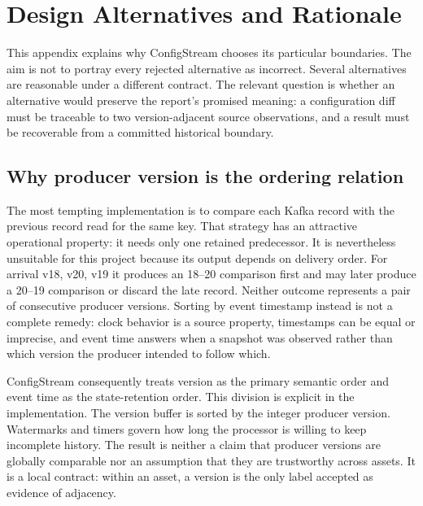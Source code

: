 
\section{Design Alternatives and Rationale}
\label{app:design-rationale}

This appendix explains why ConfigStream chooses its particular boundaries. The aim is not to portray every rejected alternative as incorrect. Several alternatives are reasonable under a different contract. The relevant question is whether an alternative would preserve the report's promised meaning: a configuration diff must be traceable to two version-adjacent source observations, and a result must be recoverable from a committed historical boundary.

\subsection{Why producer version is the ordering relation}

The most tempting implementation is to compare each Kafka record with the previous record read for the same key. That strategy has an attractive operational property: it needs only one retained predecessor. It is nevertheless unsuitable for this project because its output depends on delivery order. For arrival v18, v20, v19 it produces an 18--20 comparison first and may later produce a 20--19 comparison or discard the late record. Neither outcome represents a pair of consecutive producer versions. Sorting by event timestamp instead is not a complete remedy: clock behavior is a source property, timestamps can be equal or imprecise, and event time answers when a snapshot was observed rather than which version the producer intended to follow which.

ConfigStream consequently treats version as the primary semantic order and event time as the state-retention order. This division is explicit in the implementation. The version buffer is sorted by the integer producer version. Watermarks and timers govern how long the processor is willing to keep incomplete history. The result is neither a claim that producer versions are globally comparable nor an assumption that they are trustworthy across assets. It is a local contract: within an asset, a version is the only label accepted as evidence of adjacency.

